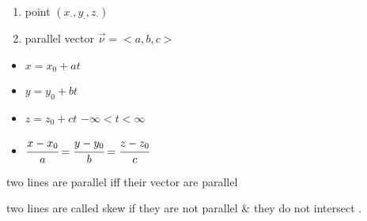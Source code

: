 \noindent{\color{smalt(darkpowderblue)}\rule{\linewidth}{.2mm}}
{} 
\begin{enumerate}
    \item point $(x_\cdot , y_\cdot , z_\cdot )$
    \item  parallel vector $\overrightarrow{\nu} = <a,b,c>$
\end{enumerate}
{} 
\begin{itemize}
    \item $x=x_0 + at$
    \item $y=y_0 + bt$ 
    \item $z=z_0 +ct$ \hspace{1cm}$ -\infty < t < \infty $
\end{itemize}
{} 
\begin{itemize}
    \item $ \cfrac{x-x_0}{a} = \cfrac{y-y_0}{b} = \cfrac{z-z_0}{c}$
\end{itemize} 
\begin{remark}
  two lines are parallel iff their vector are parallel 
\end{remark}
\begin{definition}
 two lines are called skew if they are not parallel $\&$ they do not intersect .
\end{definition}
 \noindent{\color{smalt(darkpowderblue)}\rule{\linewidth}{.2mm}}
